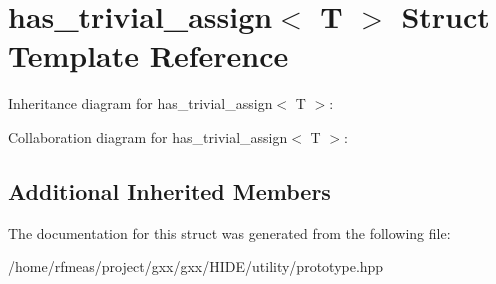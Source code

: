 \hypertarget{structhas__trivial__assign}{}\section{has\+\_\+trivial\+\_\+assign$<$ T $>$ Struct Template Reference}
\label{structhas__trivial__assign}


Inheritance diagram for has\+\_\+trivial\+\_\+assign$<$ T $>$\+:


Collaboration diagram for has\+\_\+trivial\+\_\+assign$<$ T $>$\+:
\subsection*{Additional Inherited Members}


The documentation for this struct was generated from the following file\+:\begin{DoxyCompactItemize}
\item 
/home/rfmeas/project/gxx/gxx/\+H\+I\+D\+E/utility/prototype.\+hpp\end{DoxyCompactItemize}

